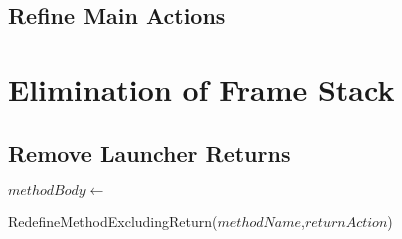\subsection{Refine Main Actions}

\RunningRefinementRule*

\section{Elimination of Frame Stack}

\subsection{Remove Launcher Returns}
\label{remove-launcher-returns-appendix-subsection}

\begin{algorithm}[htb!]
  \begin{algorithmic}[1]
    \State $methodBody \gets$ 
    \State {}
    \State {}
    \State {}
    \State {}
    \State {}
  \end{algorithmic}
  \caption{RedefineMethodExcludingReturn($methodName$,$returnAction$)}
  \label{redefine-method-action-excluding-return-action-algorithm}
\end{algorithm}

